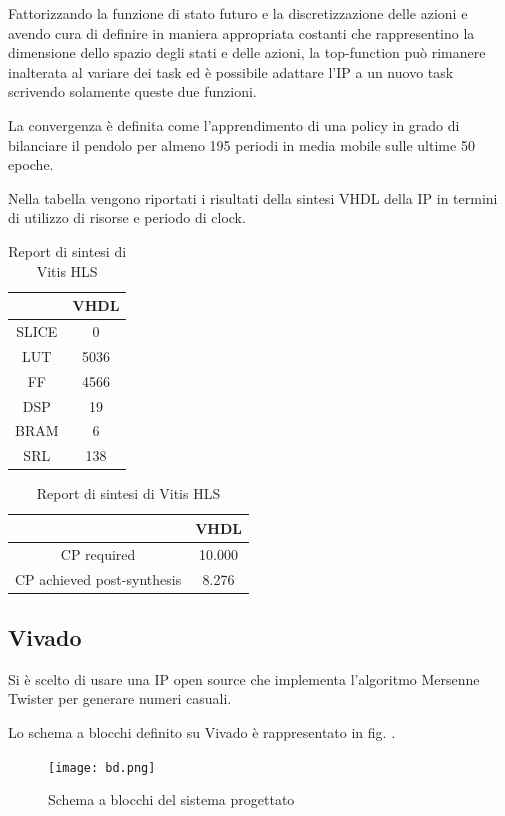 \documentclass{article}
\begin{document}
Fattorizzando la funzione di stato futuro e la discretizzazione delle azioni e avendo cura di definire in maniera appropriata costanti che rappresentino la dimensione dello spazio degli stati e delle azioni, la top-function può rimanere inalterata al variare dei task ed è possibile adattare l'IP a un nuovo task scrivendo solamente queste due funzioni. 

La convergenza è definita come l'apprendimento di una policy in grado di bilanciare il pendolo per almeno 195 periodi in media mobile sulle ultime 50 epoche. 

Nella tabella  vengono riportati i risultati della sintesi VHDL della IP in termini di utilizzo di risorse e periodo di clock. 

\begin{table}[h!]

\centering

\begin{tabular}{|c|c|}
\hline
 &VHDL \\
 \hline
SLICE &0 \\
 \hline
LUT &5036 \\
 \hline
FF &4566 \\
 \hline
DSP &19 \\
 \hline
BRAM &6 \\
 \hline
SRL &138 \\
 \hline

\end{tabular}

\vspace{1em}

\begin{tabular}{|c|c|}
\hline 
 &VHDL \\
 \hline 
CP required &10.000 \\
 \hline 
CP achieved post-synthesis &8.276 \\
 \hline 
\end{tabular}
\caption{Report di sintesi di Vitis HLS}
\label{table:synthesis}

\end{table}
\subsection{Vivado}
Si è scelto di usare una IP open source \citep{fedorko_wfedorkomersenne-twister-hls_2018} che implementa l'algoritmo Mersenne Twister per generare numeri casuali. 

Lo schema a blocchi definito su Vivado è rappresentato in fig. .
\begin{figure}[h!]

\centering


\texttt{[image: bd.png]}
\caption{Schema a blocchi del sistema progettato}
\label{fig:bd}
\end{figure}
\end{document}
